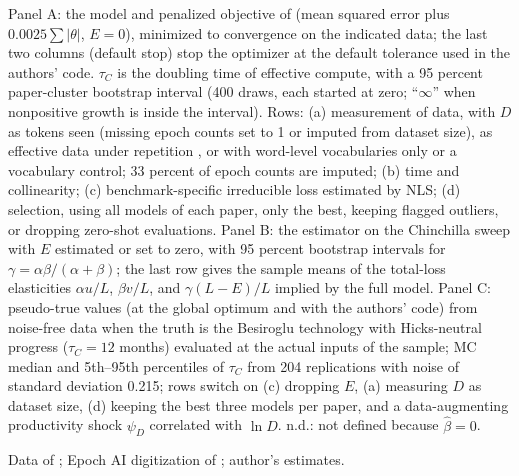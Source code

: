 \begin{table}[tp]
\begin{tablenotes}Panel A: the model and penalized objective of \citet{ho2024algorithmic} (mean squared error plus $0.0025\sum|\theta|$, $E=0$), minimized to convergence on the indicated data; the last two columns (default stop) stop the optimizer at the default tolerance used in the authors' code. $\tau_C$ is the doubling time of effective compute, with a 95 percent paper-cluster bootstrap interval (400 draws, each started at zero; ``$\infty$'' when nonpositive growth is inside the interval). Rows: (a) measurement of data, with $D$ as tokens seen (missing epoch counts set to 1 or imputed from dataset size), as effective data under repetition \citep[$R^*=15.4$;][]{muennighoff2023scaling}, or with word-level vocabularies only or a vocabulary control; 33 percent of epoch counts are imputed; (b) time and collinearity; (c) benchmark-specific irreducible loss estimated by NLS; (d) selection, using all models of each paper, only the best, keeping flagged outliers, or dropping zero-shot evaluations. Panel B: the \citet{besiroglu2024chinchilla} estimator on the Chinchilla sweep with $E$ estimated or set to zero, with 95 percent bootstrap intervals for $\gamma=\alpha\beta/(\alpha+\beta)$; the last row gives the sample means of the total-loss elasticities $\alpha u/L$, $\beta v/L$, and $\gamma(L-E)/L$ implied by the full model. Panel C: pseudo-true values (at the global optimum and with the authors' code) from noise-free data when the truth is the Besiroglu technology with Hicks-neutral progress ($\tau_C=12$ months) evaluated at the actual inputs of the sample; MC median and 5th--95th percentiles of $\tau_C$ from 204 replications with noise of standard deviation 0.215; rows switch on (c) dropping $E$, (a) measuring $D$ as dataset size, (d) keeping the best three models per paper, and a data-augmenting productivity shock $\psi_D$ correlated with $\ln D$. n.d.: not defined because $\hat\beta=0$.\end{tablenotes}
\begin{tablenotes}[Source]Data of \citet{ho2024algorithmic}; Epoch AI digitization of \citet{hoffmann2022training}; author's estimates.\end{tablenotes}
\end{table}
